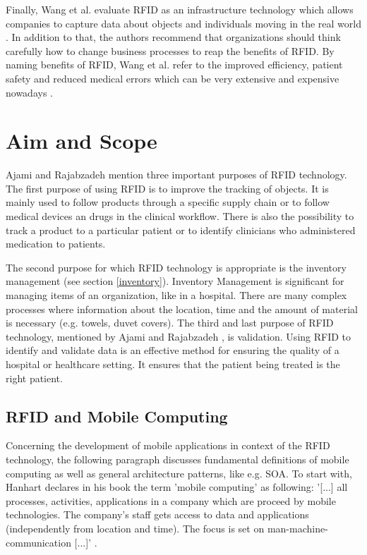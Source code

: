 Finally, Wang et al. evaluate RFID as an infrastructure technology which allows companies to capture data about objects and individuals moving in the real world \cite[p.7]{casestudy}. In addition to that, the authors recommend that organizations should think carefully how to change business processes to reap the benefits of RFID. By naming benefits of RFID, Wang et al. refer to the improved efficiency, patient safety and reduced medical errors which can be very extensive and expensive nowadays \cite{casestudy}.

\section{Aim and Scope} \label{aim}

Ajami and Rajabzadeh \cite{ncbi} mention three important purposes of RFID technology. The first purpose of using RFID is to improve the tracking of objects. It is mainly used to follow products through a specific supply chain or to follow medical devices an drugs in the clinical workflow. There is also the possibility to track a product to a particular patient or to identify clinicians who administered medication to patients.

The second purpose for which RFID technology is appropriate is the inventory management (see section \ref{inventory}). Inventory Management is significant for managing items of an organization, like in a hospital. There are many complex processes where information about the location, time and the amount of material is necessary (e.g. towels, duvet covers).
The third and last purpose of RFID technology, mentioned by Ajami and Rajabzadeh \cite{ncbi}, is validation. Using RFID to identify and validate data is an effective method for ensuring the quality of a hospital or healthcare setting. It ensures that the patient being treated is the right patient.

\subsection{RFID and Mobile Computing}

Concerning the development of mobile applications in context of the RFID technology, the following paragraph discusses fundamental definitions of mobile computing as well as general architecture patterns, like e.g. \ac{SOA}. 
To start with, Hanhart declares in his book \cite[p.9 ff.]{mobile} the term 'mobile computing' as following: '[...] all processes, activities, applications in a company which are proceed by mobile technologies. The company's staff gets access to data and applications (independently from location and time). The focus is set on man-machine-communication [...]' \cite[p.9 ff.]{mobile}. 

